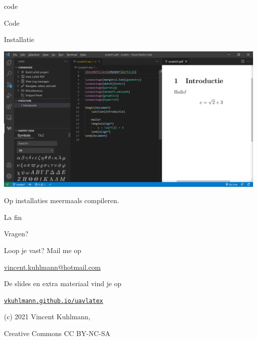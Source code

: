 \documentclass[presentatie.tex]{subfiles}
\begin{document}
\section{\texorpdfstring{}{Goed om te weten}}%

\clearrecentlist
    

\begin{saveblock}{code}
	\begin{highlightblock}[gobble=8,linewidth=0.5\textwidth,framexleftmargin=0.25em]
        Code
	\end{highlightblock}
\end{saveblock}

\begin{frame}
    {Installatie}

    \includegraphics[width=\linewidth,height=0.8\textheight,keepaspectratio]{assets/Misc/VisualStudioCodeDemo.png}
\end{frame}

\begin{frame}
    Op installaties meermaals compileren.
\end{frame}

\begin{frame}{La fin}
	\begin{center}
		\LARGE Vragen?
	\end{center}

    \bigskip
	

    \begin{center}
        Loop je vast? Mail me op\par
        \url{vincent.kuhlmann@hotmail.com}
    \end{center}

    \begin{center}
        De slides en extra materiaal vind je op\par
        \href{https://vkuhlmann.github.io/uavlatex}{\ul{\texttt{vkuhlmann.github.io/uavlatex}}}
    \end{center}
    \begin{center}
        (c) 2021 Vincent Kuhlmann,\par
        Creative Commons CC BY-NC-SA
    \end{center}
\end{frame}
\end{document}
